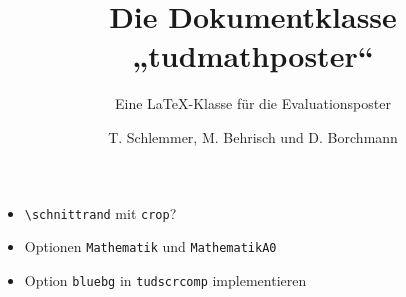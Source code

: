 \documentclass[a0paper,noDIN,MathematikA0]{tudmathposter}
\author{T. Schlemmer, M. Behrisch und D. Borchmann}%
\title{Die Dokumentklasse „tudmathposter“}
\subtitle{Eine \LaTeX-Klasse für die Evaluationsposter}
\begin{document}
  \providecommand{\cs}[1]{\texttt{\textbackslash#1}}
  \providecommand{\pkg}[1]{\texttt{#1}}
  \providecommand{\env}[1]{\texttt{#1}}
  \providecommand{\opt}[1]{\texttt{#1}}
 \begin{itemize}
   \item \cs{schnittrand} mit \pkg{crop}?
   \item Optionen \opt{Mathematik} und \opt{MathematikA0}
   \item Option \opt{bluebg} in \pkg{tudscrcomp} implementieren
 \end{itemize}%
\maketitle
\end{document}
